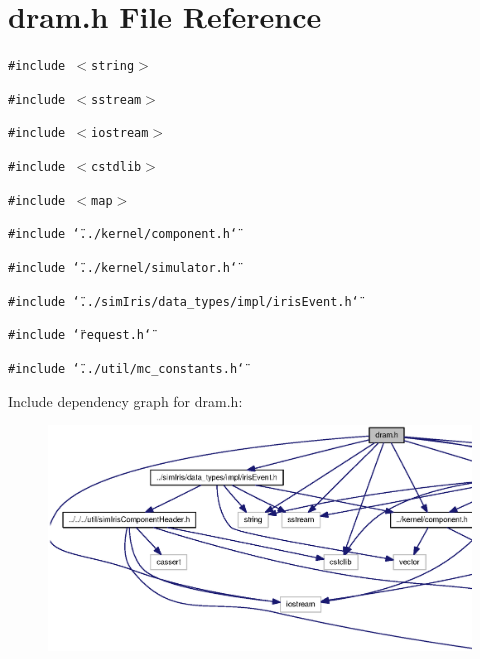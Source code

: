 \section{dram.h File Reference}
\label{dram_8h}
{\tt \#include $<$string$>$}\par
{\tt \#include $<$sstream$>$}\par
{\tt \#include $<$iostream$>$}\par
{\tt \#include $<$cstdlib$>$}\par
{\tt \#include $<$map$>$}\par
{\tt \#include \char`\"{}../kernel/component.h\char`\"{}}\par
{\tt \#include \char`\"{}../kernel/simulator.h\char`\"{}}\par
{\tt \#include \char`\"{}../simIris/data\_\-types/impl/irisEvent.h\char`\"{}}\par
{\tt \#include \char`\"{}request.h\char`\"{}}\par
{\tt \#include \char`\"{}../util/mc\_\-constants.h\char`\"{}}\par


Include dependency graph for dram.h:\nopagebreak
\begin{figure}[H]
\begin{center}
\leavevmode
\includegraphics[width=420pt]{dram_8h__incl}
\end{center}
\end{figure}


